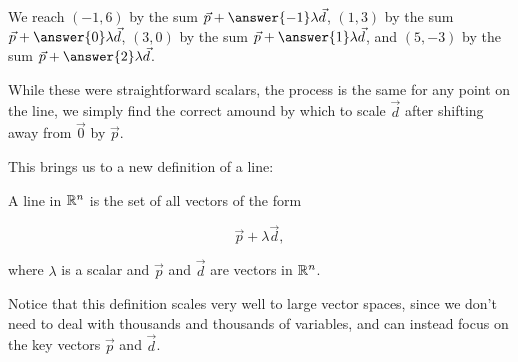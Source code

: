 \documentclass{ximera}
\begin{document}
\begin{exploration}
\begin{solution}
    \begin{center}
      \end{center}

  \end{solution}

  We reach $(-1,6)$ by the sum $\vec{p}+\answer{-1}\lambda\vec{d}$, $(1,3)$ by the sum $\vec{p}+\answer{0}\lambda\vec{d}$, $(3,0)$ by the sum $\vec{p}+\answer{1}\lambda\vec{d}$, and $(5,-3)$ by the sum $\vec{p}+\answer{2}\lambda\vec{d}$.

  While these were straightforward scalars, the process is the same for any point on the line, we simply find the correct amound by which to scale $\vec{d}$ after shifting away from $\vec{0}$ by $\vec{p}$.

\end{exploration}

This brings us to a new definition of a line:

\begin{definition}
  A line in $\mathbb{R}^n$ is the set of all vectors of the form 

  $$\vec{p}+\lambda \vec{d},$$

  where $\lambda$ is a scalar and $\vec{p}$ and $\vec{d}$ are vectors in $\mathbb{R}^n$.
\end{definition}

Notice that this definition scales very well to large vector spaces, since we don't need to deal with thousands and thousands of variables, and can instead focus on the key vectors $\vec{p}$ and $\vec{d}$.
 
\end{document}
